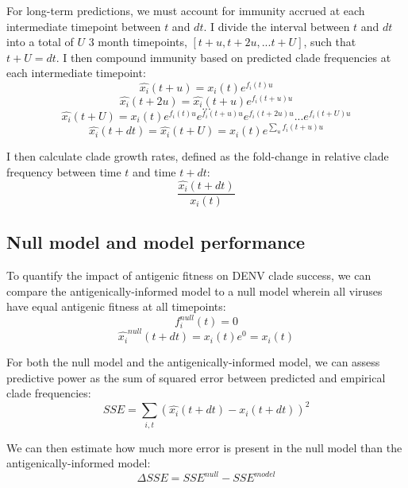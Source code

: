 For long-term predictions, we must account for immunity accrued at each intermediate timepoint between $t$ and $dt$.
I divide the interval between $t$ and $dt$ into a total of $U$ 3 month timepoints, $[t+u, t+2u, ... t+U]$, such that $t+U=dt$.
I then compound immunity based on predicted clade frequencies at each intermediate timepoint:
\begin{equation}
\hat{x_i}(t+u) = x_i(t)e^{f_i(t) u}
\end{equation}
\begin{equation}
\hat{x_i}(t+2u) = \hat{x_i}(t+u) e^{f_i(t+u)u}
\end{equation}
$$...$$
\begin{equation}
\hat{x_i}(t+U) = x_i(t) e^{f_i(t)u} e^{f_i(t+u)u} e^{f_i(t+2u)u} ... e^{f_i(t+U)u}
\end{equation}
\begin{equation}
  \label{eq_compounding_immunity}
\hat{x_i}(t+dt) = \hat{x_i}(t+U) = x_i(t) e^{\sum_{u}f_i(t+u)u}
\end{equation}

I then calculate clade growth rates, defined as the fold-change in relative clade frequency between time $t$ and time $t+dt$:
\begin{equation}
  \label{eq_growth_rate}
\frac{\hat{x_i}(t+dt)}{x_i(t)}
\end{equation}

\subsection*{Null model and model performance}
To quantify the impact of antigenic fitness on DENV clade success, we can compare the antigenically-informed model to a null model wherein all viruses have equal antigenic fitness at all timepoints:
\begin{equation}
  \label{eq_null}
f_i^{null}(t) = 0
\end{equation}
\begin{equation}
\hat{x_i}^{null}(t+dt) = x_i(t) e^0 = x_i(t)
\end{equation}

For both the null model and the antigenically-informed model, we can assess predictive power as the sum of squared error between predicted and empirical clade frequencies:
\begin{equation}
  \label{eq_sse}
SSE = \sum_{i,t} \left( \hat{x_i}(t+dt) - x_{i}(t+dt) \right)^2
\end{equation}

We can then estimate how much more error is present in the null model than the antigenically-informed model:
\begin{equation}
  \label{eq_delta_sse}
\Delta SSE = SSE^{null} - SSE^{model}
\end{equation}

